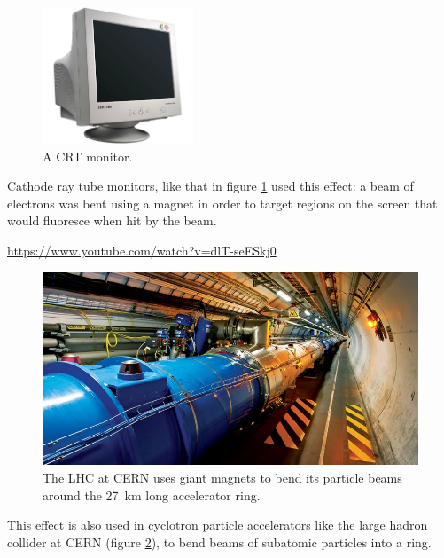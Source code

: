 \documentclass[a4paper]{amsbook}
\newcommand\capcite[1]{}
\begin{document}
\begin{figure}
  \centering
  \includegraphics[width=0.4\textwidth]{crt}
  \caption{A CRT monitor. \capcite{http://3dvision-blog.com/wp-content/uploads/2012/02/samsung-crt-monitor.jpg}\label{fig:crt}}
\end{figure}
Cathode ray tube monitors, like that in figure \ref{fig:crt} used this effect: a beam of electrons was bent using a magnet in
order to target regions on the screen that would fluoresce when hit by the beam.

\begin{center}
\begin{tcolorbox}[width=0.8\textwidth,colback={red},title={\textbf{Go and watch...}},colbacktitle=yellow,coltitle=blue]
  \textcolor{white}{\url{https://www.youtube.com/watch?v=dlT-seESkj0}}
\end{tcolorbox}
\end{center}

\begin{figure}
  \centering
  \includegraphics[width=\textwidth]{lhc}
  \caption{The LHC at CERN uses giant magnets to bend its particle beams around the \SI{27}{\kilo\meter} long accelerator ring. \capcite{https://home.cern/sites/home.web.cern.ch/files/image/inline-images/old/lhc_long_1.jpg}\label{fig:lhc}}
\end{figure}

This effect is also used in cyclotron particle accelerators like the large hadron collider at CERN (figure \ref{fig:lhc}),
to bend beams of subatomic particles into a ring.
\end{document}
